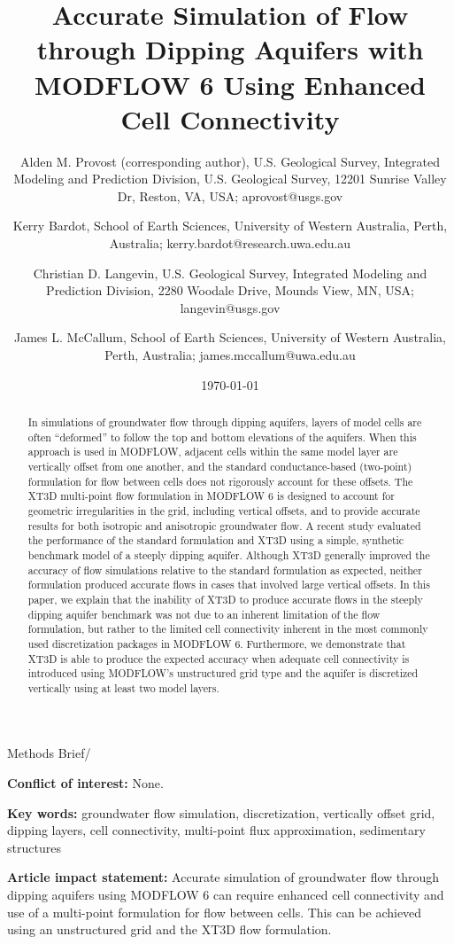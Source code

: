 \documentclass{article}
\title{Accurate Simulation of Flow through Dipping Aquifers with MODFLOW 6 Using Enhanced Cell Connectivity}
\author{
	Alden M. Provost (corresponding author), U.S. Geological Survey, Integrated Modeling and Prediction Division, U.S. Geological Survey, 12201 Sunrise Valley Dr, Reston, VA, USA; aprovost@usgs.gov \\
	\and 
	Kerry Bardot, School of Earth Sciences, University of Western Australia, Perth, Australia; kerry.bardot@research.uwa.edu.au \\
	\and 
	Christian D. Langevin, U.S. Geological Survey, Integrated Modeling and Prediction Division, 2280 Woodale Drive, Mounds View, MN, USA; langevin@usgs.gov \\
	\and 
	James L. McCallum, School of Earth Sciences, University of Western Australia, Perth, Australia; james.mccallum@uwa.edu.au \\
	}
\date{\today}
\begin{document}
\noindent Methods Brief/

{\let\newpage\relax\maketitle}

\textbf{Conflict of interest:} None.

\textbf{Key words:} groundwater flow simulation, discretization, vertically offset grid, dipping layers, cell connectivity, multi-point flux approximation, sedimentary structures

\textbf{Article impact statement:} Accurate simulation of groundwater flow through dipping aquifers using MODFLOW 6 can require enhanced cell connectivity and use of a multi-point formulation for flow between cells. This can be achieved using an unstructured grid and the XT3D flow formulation.

\begin{abstract}

In simulations of groundwater flow through dipping aquifers, layers of model cells are often ``deformed'' to follow the top and bottom elevations of the aquifers. When this approach is used in MODFLOW, adjacent cells within the same model layer are vertically offset from one another, and the standard conductance-based (two-point) formulation for flow between cells does not rigorously account for these offsets. The XT3D multi-point flow formulation in MODFLOW 6 is designed to account for geometric irregularities in the grid, including vertical offsets, and to provide accurate results for both isotropic and anisotropic groundwater flow.  A recent study evaluated the performance of the standard formulation and XT3D using a simple, synthetic benchmark model of a steeply dipping aquifer. Although XT3D generally improved the accuracy of flow simulations relative to the standard formulation as expected, neither formulation produced accurate flows in cases that involved large vertical offsets. In this paper, we explain that the inability of XT3D to produce accurate flows in the steeply dipping aquifer benchmark was not due to an inherent limitation of the flow formulation, but rather to the limited cell connectivity inherent in the most commonly used discretization packages in MODFLOW 6. Furthermore, we demonstrate that XT3D is able to produce the expected accuracy when adequate cell connectivity is introduced using MODFLOW's unstructured grid type and the aquifer is discretized vertically using at least two model layers.

\end{abstract}
\end{document}
